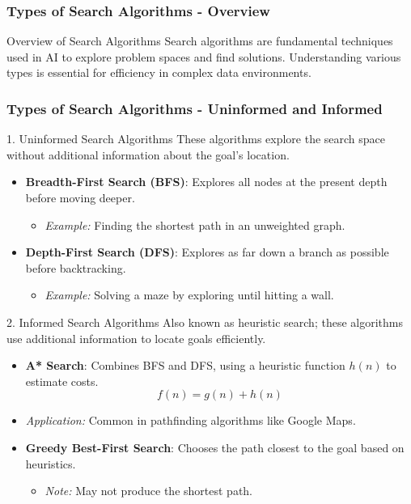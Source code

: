 \documentclass[aspectratio=169]{beamer}
\begin{document}
\begin{frame}[fragile]
    \frametitle{Types of Search Algorithms - Overview}
    \begin{block}{Overview of Search Algorithms}
        Search algorithms are fundamental techniques used in AI to explore problem spaces and find solutions. 
        Understanding various types is essential for efficiency in complex data environments.
    \end{block}
\end{frame}

\begin{frame}[fragile]
    \frametitle{Types of Search Algorithms - Uninformed and Informed}
    \begin{block}{1. Uninformed Search Algorithms}
        These algorithms explore the search space without additional information about the goal's location.
        \begin{itemize}
            \item \textbf{Breadth-First Search (BFS)}: Explores all nodes at the present depth before moving deeper.
                \begin{itemize}
                    \item \textit{Example:} Finding the shortest path in an unweighted graph.
                \end{itemize}
            \item \textbf{Depth-First Search (DFS)}: Explores as far down a branch as possible before backtracking.
                \begin{itemize}
                    \item \textit{Example:} Solving a maze by exploring until hitting a wall.
                \end{itemize}
        \end{itemize}
        \begin{block}{2. Informed Search Algorithms}
            Also known as heuristic search; these algorithms use additional information to locate goals efficiently.
            \begin{itemize}
                \item \textbf{A* Search}: Combines BFS and DFS, using a heuristic function \( h(n) \) to estimate costs.
                    \begin{equation}
                        f(n) = g(n) + h(n)
                    \end{equation}
                    \item \textit{Application:} Common in pathfinding algorithms like Google Maps.
                \item \textbf{Greedy Best-First Search}: Chooses the path closest to the goal based on heuristics.
                    \begin{itemize}
                        \item \textit{Note:} May not produce the shortest path.
                    \end{itemize}
            \end{itemize}
        \end{block}
    \end{block}
\end{frame}
\end{document}
